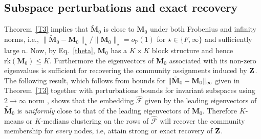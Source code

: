 \documentclass[10pt,journal,compsoc]{IEEEtran}
\newcommand{\bds}{\boldsymbol}
\newcommand{\M}[1]{{{\mathbf{\MakeUppercase{#1}}}}}
\numberwithin{equation}{section}
\begin{document}
\subsection{Subspace perturbations and exact recovery}
Theorem~\ref{T3} implies that $\tilde{\mathbf{M}}_0$ is close to
$\mathbf{M}_0$ under both Frobenius and infinity norms, i.e., 
$\|\tilde{\mathbf{M}}_0 - \mathbf{M}_0\|_{\star}/\|\mathbf{M}_0\|_{\star} =
o_{\mathbb{P}}(1)$ for $\star \in \{F, \infty\}$ and sufficiently large $n$. 
Now, by Eq.~\eqref{theta}, $\mathbf{M}_0$ has a $K \times K$
block structure and hence $\mathrm{rk}(\mathbf{M}_0) \leq K$. %
Furthermore the
eigenvectors of $\mathbf{M}_0$ associated with its non-zero eigenvalues is
sufficient for recovering the community assignments induced by
$\M Z$. The following result, which follows from bounds for $\|\tilde{\M M}_0 - \mathbf{M}_0\|_{\infty}$ given in Theorem~\ref{T3} together with perturbations bounds for invariant subspaces using $2\rightarrow \infty$ norm \cite{cape2019two}, shows that  
the embedding $\hat{\bds{\mathcal{F}}}$ given by the leading
eigenvectors of $\tilde{\mathbf{M}}_0$ is {\em uniformly} close to
that of the leading eigenvectors of $\mathbf{M}_0$. Therefore $K$-means or $K$-medians clustering on the rows of $\hat{\bds{\mathcal{F}}}$ will recover the community membership for \textit{every} nodes, i.e, attain strong or exact recovery of $\M Z$.%
\end{document}
